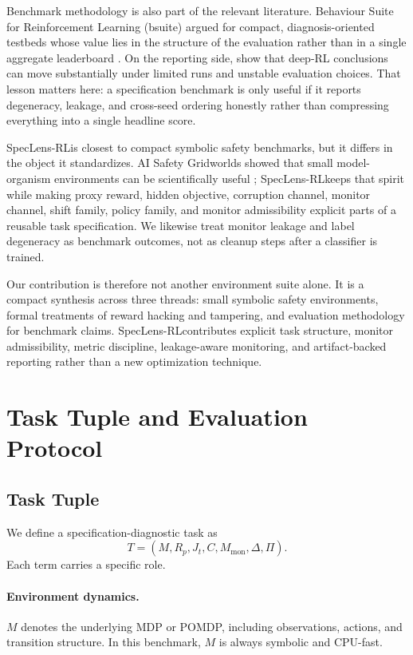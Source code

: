 \documentclass{article}
\newcommand{\framework}{SpecLens-RL}
\begin{document}
Benchmark methodology is also part of the relevant literature. Behaviour Suite
for Reinforcement Learning (bsuite) argued for compact, diagnosis-oriented
testbeds whose value lies in the structure of the evaluation rather than in a
single aggregate leaderboard \citep{osband2020bsuite}. On the reporting side,
\citet{agarwal2021precipice} show that deep-RL conclusions can move
substantially under limited runs and unstable evaluation choices. That lesson
matters here: a specification benchmark is only useful if it reports
degeneracy, leakage, and cross-seed ordering honestly rather than compressing
everything into a single headline score.

\framework is closest to compact symbolic safety benchmarks, but it differs in
the object it standardizes. AI Safety Gridworlds showed that small
model-organism environments can be scientifically useful \citep{leike2017ai};
\framework keeps that spirit while making proxy reward, hidden objective,
corruption channel, monitor channel, shift family, policy family, and monitor
admissibility explicit parts of a reusable task specification. We likewise
treat monitor leakage and label degeneracy as benchmark outcomes, not as
cleanup steps after a classifier is trained.

Our contribution is therefore not another environment suite alone. It is a
compact synthesis across three threads: small symbolic safety environments,
formal treatments of reward hacking and tampering, and evaluation methodology
for benchmark claims. \framework contributes explicit task structure, monitor
admissibility, metric discipline, leakage-aware monitoring, and artifact-backed
reporting rather than a new optimization technique.
\section{Task Tuple and Evaluation Protocol}
\subsection{Task Tuple}
We define a specification-diagnostic task as
\[
T = (M, R_p, J_t, C, M_{\mathrm{mon}}, \Delta, \Pi).
\]
Each term carries a specific role.

\paragraph{Environment dynamics.}
$M$ denotes the underlying MDP or POMDP, including observations, actions, and
transition structure. In this benchmark, $M$ is always symbolic and CPU-fast.
\end{document}
